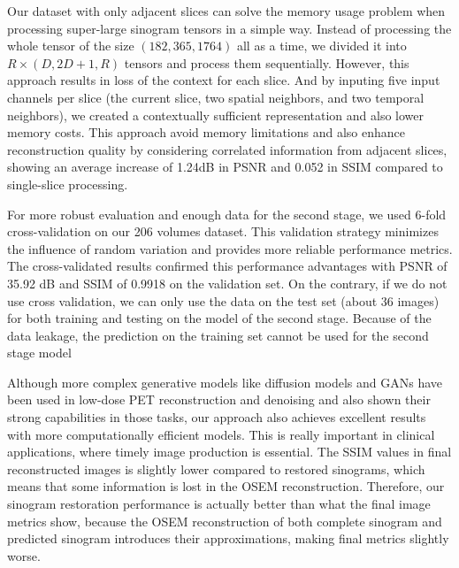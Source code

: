 \documentclass[aps,prb,preprint,groupedaddress,showkeys]{revtex4}
\begin{document}
Our dataset with only adjacent slices can solve the memory usage problem when processing super-large sinogram tensors in a simple way. Instead of processing the whole tensor of the size $(182, 365, 1764)$ all as a time, we divided it into $R\times(D, 2D+1, R)$ tensors and process them sequentially. However, this approach results in loss of the context for each slice. And by inputing five input channels per slice (the current slice, two spatial neighbors, and two temporal neighbors), we created a contextually sufficient representation and also lower memory costs. This approach  avoid memory limitations and also enhance reconstruction quality by considering correlated information from adjacent slices, showing an average increase of 1.24dB in PSNR and 0.052 in SSIM compared to single-slice processing.

For more robust evaluation and enough data for the second stage, we used 6-fold cross-validation on our 206 volumes dataset. 
This validation strategy minimizes the influence of random variation and provides more reliable performance metrics. The cross-validated results confirmed this performance advantages with PSNR of 35.92 dB and SSIM of 0.9918 on the validation set. 
On the contrary, if we do not use cross validation, we can only use the data on the test set (about 36 images) for both training and testing on the model of the second stage. Because of the data leakage, the prediction on the training set cannot be used for the second stage model 

Although more complex generative models like diffusion models and GANs have been used in low-dose PET reconstruction and denoising and also shown their strong capabilities in those tasks, our approach also achieves excellent results with more computationally efficient models. This is really important in clinical applications, where timely image production is essential.
The SSIM values in final reconstructed images is slightly lower compared to restored sinograms, which means that some information is lost in the OSEM reconstruction. 
Therefore, our sinogram restoration performance is actually better than what the final image metrics show, because the OSEM reconstruction of both complete sinogram and predicted sinogram introduces their approximations, making final metrics slightly worse.
\end{document}
